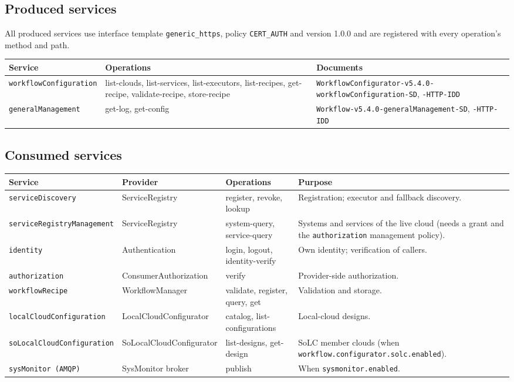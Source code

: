 \documentclass[a4paper]{arrowhead}
\begin{document}
\subsection{Produced services}
All produced services use interface template \texttt{generic\_https}, policy \texttt{CERT\_AUTH} and version 1.0.0 and are
registered with every operation's method and path.

{\small
\begin{longtable}{|p{3.8cm}|p{6.2cm}|p{5.8cm}|}

\hline
\rowcolor{gray!33} Service & Operations & Documents \\ \hline
\endhead
\texttt{workflowConfiguration} & list-clouds, list-services, list-executors, list-recipes, get-recipe, validate-recipe, store-recipe & \texttt{WorkflowConfigurator-v5.4.0-workflowConfiguration-SD}, \texttt{-HTTP-IDD} \\ \hline
\texttt{generalManagement} & get-log, get-config & \texttt{Workflow-v5.4.0-generalManagement-SD}, \texttt{-HTTP-IDD} \\ \hline
\end{longtable}
}

\subsection{Consumed services}

{\small
\begin{longtable}{|p{3.4cm}|p{3.2cm}|p{3.6cm}|p{5.6cm}|}

\hline
\rowcolor{gray!33} Service & Provider & Operations & Purpose \\ \hline
\endhead
\texttt{serviceDiscovery} & ServiceRegistry & register, revoke, lookup & Registration; executor and fallback discovery. \\ \hline
\texttt{serviceRegistryManagement} & ServiceRegistry & system-query, service-query & Systems and services of the live cloud (needs a grant and the \texttt{authorization} management policy). \\ \hline
\texttt{identity} & Authentication & login, logout, identity-verify & Own identity; verification of callers. \\ \hline
\texttt{authorization} & ConsumerAuthorization & verify & Provider-side authorization. \\ \hline
\texttt{workflowRecipe} & WorkflowManager & validate, register, query, get & Validation and storage. \\ \hline
\texttt{localCloudConfiguration} & LocalCloudConfigurator & catalog, list-configurations & Local-cloud designs. \\ \hline
\texttt{soLocalCloudConfiguration} & SoLocalCloudConfigurator & list-designs, get-design & SoLC member clouds (when \texttt{workflow.configurator.solc.enabled}). \\ \hline
\texttt{sysMonitor (AMQP)} & SysMonitor broker & publish & When \texttt{sysmonitor.enabled}. \\ \hline
\end{longtable}
}
\end{document}
